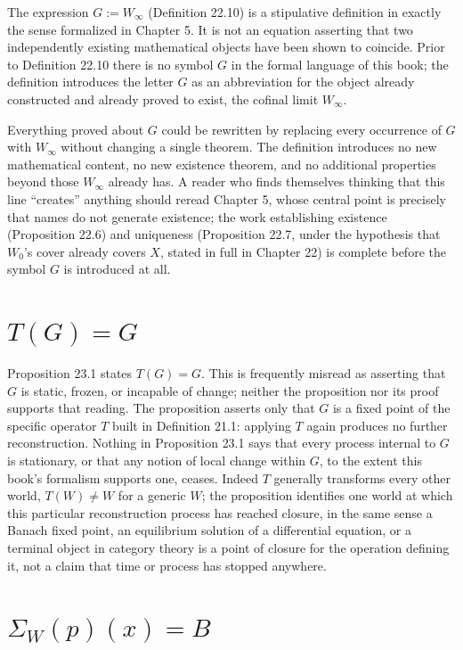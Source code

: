 \documentclass[11pt]{book}
\begin{document}
The expression $G := W_\infty$ (Definition 22.10) is a stipulative definition in exactly the sense formalized in Chapter 5. It is not an equation asserting that two independently existing mathematical objects have been shown to coincide. Prior to Definition 22.10 there is no symbol $G$ in the formal language of this book; the definition introduces the letter $G$ as an abbreviation for the object already constructed and already proved to exist, the cofinal limit $W_\infty$.

Everything proved about $G$ could be rewritten by replacing every occurrence of $G$ with $W_\infty$ without changing a single theorem. The definition introduces no new mathematical content, no new existence theorem, and no additional properties beyond those $W_\infty$ already has. A reader who finds themselves thinking that this line ``creates'' anything should reread Chapter 5, whose central point is precisely that names do not generate existence; the work establishing existence (Proposition 22.6) and uniqueness (Proposition 22.7, under the hypothesis that $W_0$'s cover already covers $X$, stated in full in Chapter 22) is complete before the symbol $G$ is introduced at all.

\section*{$T(G) = G$}

Proposition 23.1 states $T(G) = G$. This is frequently misread as asserting that $G$ is static, frozen, or incapable of change; neither the proposition nor its proof supports that reading. The proposition asserts only that $G$ is a fixed point of the specific operator $T$ built in Definition 21.1: applying $T$ again produces no further reconstruction. Nothing in Proposition 23.1 says that every process internal to $G$ is stationary, or that any notion of local change within $G$, to the extent this book's formalism supports one, ceases. Indeed $T$ generally transforms every other world, $T(W) \neq W$ for a generic $W$; the proposition identifies one world at which this particular reconstruction process has reached closure, in the same sense a Banach fixed point, an equilibrium solution of a differential equation, or a terminal object in category theory is a point of closure for the operation defining it, not a claim that time or process has stopped anywhere.

\section*{$\Sigma_W(p)(x) = B$}
\end{document}
